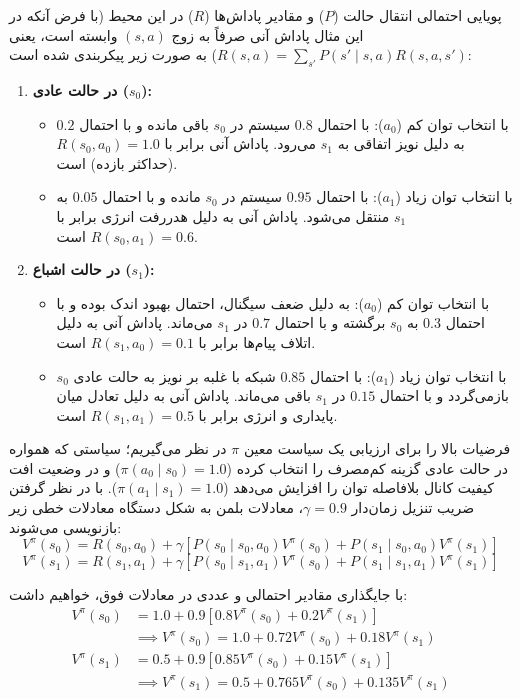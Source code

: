 \documentclass[oneside,openany,phd]{TMU-Thesis}
\begin{document}
پویایی احتمالی انتقال حالت ($P$) و مقادیر پاداش‌ها ($R$) در این محیط (با فرض آنکه در این مثال پاداش آنی صرفاً به زوج $(s, a)$ وابسته است، یعنی $R(s, a) = \sum_{s'} P(s' \mid s, a) R(s, a, s')$) به صورت زیر پیکربندی شده است:
\begin{enumerate}
    \item \textbf{در حالت عادی ($s_0$):}
    \begin{itemize}
        \item با انتخاب توان کم ($a_0$): با احتمال $0.8$ سیستم در $s_0$ باقی مانده و با احتمال $0.2$ به دلیل نویز اتفاقی به $s_1$ می‌رود. پاداش آنی برابر با $R(s_0, a_0) = 1.0$ (حداکثر بازده) است.
        \item با انتخاب توان زیاد ($a_1$): با احتمال $0.95$ سیستم در $s_0$ مانده و با احتمال $0.05$ به $s_1$ منتقل می‌شود. پاداش آنی به دلیل هدررفت انرژی برابر با $R(s_0, a_1) = 0.6$ است.
    \end{itemize}
    \item \textbf{در حالت اشباع ($s_1$):}
    \begin{itemize}
        \item با انتخاب توان کم ($a_0$): به دلیل ضعف سیگنال، احتمال بهبود اندک بوده و با احتمال $0.3$ به $s_0$ برگشته و با احتمال $0.7$ در $s_1$ می‌ماند. پاداش آنی به دلیل اتلاف پیام‌ها برابر با $R(s_1, a_0) = 0.1$ است.
        \item با انتخاب توان زیاد ($a_1$): با احتمال $0.85$ شبکه با غلبه بر نویز به حالت عادی $s_0$ بازمی‌گردد و با احتمال $0.15$ در $s_1$ باقی می‌ماند. پاداش آنی به دلیل تعادل میان پایداری و انرژی برابر با $R(s_1, a_1) = 0.5$ است.
    \end{itemize}
\end{enumerate}

فرضیات بالا را برای ارزیابی یک سیاست معین $\pi$ در نظر می‌گیریم؛ سیاستی که همواره در حالت عادی گزینه کم‌مصرف را انتخاب کرده ($\pi(a_0 \mid s_0) = 1.0$) و در وضعیت افت کیفیت کانال بلافاصله توان را افزایش می‌دهد ($\pi(a_1 \mid s_1) = 1.0$). با در نظر گرفتن ضریب تنزیل زمان‌دار $\gamma = 0.9$، معادلات بلمن به شکل دستگاه معادلات خطی زیر بازنویسی می‌شوند:
$$V^\pi(s_0) = R(s_0, a_0) + \gamma \left[ P(s_0 \mid s_0, a_0) V^\pi(s_0) + P(s_1 \mid s_0, a_0) V^\pi(s_1) \right]$$
$$V^\pi(s_1) = R(s_1, a_1) + \gamma \left[ P(s_0 \mid s_1, a_1) V^\pi(s_0) + P(s_1 \mid s_1, a_1) V^\pi(s_1) \right]$$

با جایگذاری مقادیر احتمالی و عددی در معادلات فوق، خواهیم داشت:
\begin{align*}
V^\pi(s_0) &= 1.0 + 0.9 \left[ 0.8 V^\pi(s_0) + 0.2 V^\pi(s_1) \right] \\
&\implies V^\pi(s_0) = 1.0 + 0.72 V^\pi(s_0) + 0.18 V^\pi(s_1) \\[1ex]
V^\pi(s_1) &= 0.5 + 0.9 \left[ 0.85 V^\pi(s_0) + 0.15 V^\pi(s_1) \right] \\
&\implies V^\pi(s_1) = 0.5 + 0.765 V^\pi(s_0) + 0.135 V^\pi(s_1)
\end{align*}
\end{document}
